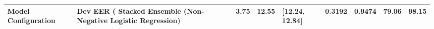 \begin{tabular}{llllllll}
\toprule
Model Configuration & Dev EER (%
\midrule
Stacked Ensemble (Non-Negative Logistic Regression) & 3.75 & 12.55 & [12.24, 12.84] & 0.3192 & 0.9474 & 79.06 & 98.15 \\
\bottomrule
\end{tabular}
